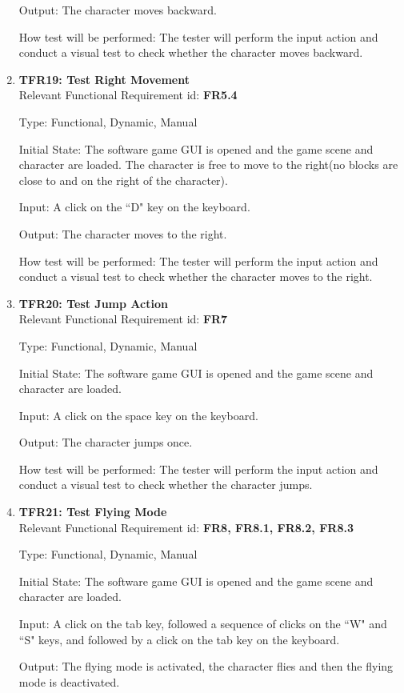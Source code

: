 \documentclass[12pt, titlepage]{article}
\begin{document}
\begin{enumerate}
Output: The character moves backward.

How test will be performed: The tester will perform the input action and conduct a visual test to check whether the character moves backward.

\item{\textbf{TFR19: Test Right Movement}\\}
Relevant Functional Requirement id: \textbf{FR5.4}

Type: Functional, Dynamic, Manual

Initial State: The software game GUI is opened and the game scene and character are loaded. The character is free to move to the right(no blocks are close to and on the right of the character).

Input: A click on the ``D" key on the keyboard.

Output: The character moves to the right.

How test will be performed: The tester will perform the input action and conduct a visual test to check whether the character moves to the right.

\item{\textbf{TFR20: Test Jump Action}\\}\label{jump}
Relevant Functional Requirement id: \textbf{FR7}

Type: Functional, Dynamic, Manual

Initial State: The software game GUI is opened and the game scene and character are loaded.

Input: A click on the space key on the keyboard.

Output: The character jumps once.

How test will be performed: The tester will perform the input action and conduct a visual test to check whether the character jumps.

\item{\textbf{TFR21: Test Flying Mode}\\}
Relevant Functional Requirement id: \textbf{FR8, FR8.1, FR8.2, FR8.3}

Type: Functional, Dynamic, Manual

Initial State: The software game GUI is opened and the game scene and character are loaded.

Input: A click on the tab key, followed a sequence of clicks on the ``W" and ``S" keys, and followed by a click on the tab key on the keyboard.

Output: The flying mode is activated, the character flies and then the flying mode is deactivated.


\end{enumerate}
\end{document}
